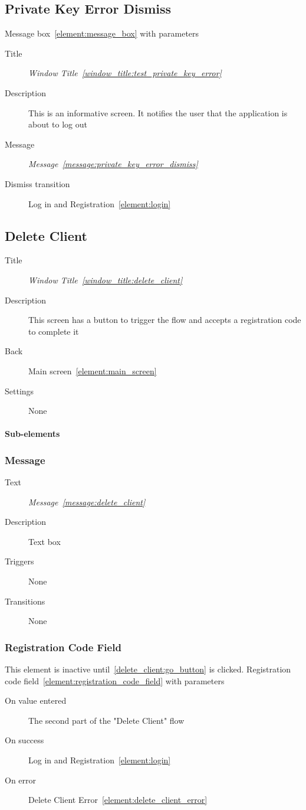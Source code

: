\documentclass[a4paper,10pt]{article}
\newcommand{\windowTitleLabelText}{Window Title}
\newcommand{\windowTitleLabel}{window_title:}
\DeclareRobustCommand{\windowTitleRef}[1]{%
   \emph{\windowTitleLabelText~\ref{\windowTitleLabel#1}}}
\newcommand{\messageLabelText}{Message}
\newcommand{\messageLabel}{message:}
\DeclareRobustCommand{\messageTextRef}[1]{%
   \emph{\messageLabelText~\ref{\messageLabel#1}}}
\newcommand{\elementLabel}{element:}
\DeclareRobustCommand{\element}[2]{\subsection{#1}\label{\elementLabel#2}}
\DeclareRobustCommand{\elementRef}[1]{\ref{\elementLabel#1}}
\begin{document}
\element{Private Key Error Dismiss}{private_key_error_dismiss}
Message box~\elementRef{message_box} with parameters
\begin{description}
 \item[Title] \windowTitleRef{test_private_key_error}
 \item[Description] This is an informative screen. It notifies the user that 
the application is about to log out
 \item[Message] \messageTextRef{private_key_error_dismiss}
 \item[Dismiss transition] Log in and Registration~\elementRef{login}
\end{description}

\element{Delete Client}{delete_client}

\begin{description}
 \item[Title] \windowTitleRef{delete_client}
 \item[Description] This screen has a button to trigger the flow and accepts a 
registration code to complete it
 \item[Back] Main screen~\elementRef{main_screen}
 \item[Settings] None
\end{description}

\paragraph{Sub-elements}

\subsubsection{Message}
\begin{description}
 \item[Text] \messageTextRef{delete_client}
 \item[Description] Text box
 \item[Triggers] None
 \item[Transitions] None
\end{description}

\subsubsection{Registration Code Field}
\label{delete_client:registration_code_field}
This element is inactive until~\ref{delete_client:go_button} is clicked. 
Registration code field~\elementRef{registration_code_field} with parameters
\begin{description}
 \item[On value entered] The second part of the "Delete Client" flow
 \item[On success] Log in and Registration~\elementRef{login}
 \item[On error] Delete Client Error~\elementRef{delete_client_error}
\end{description}
\end{document}
